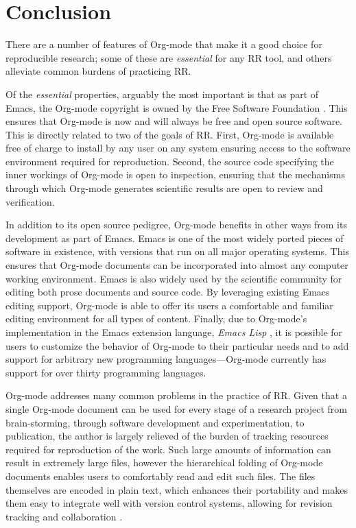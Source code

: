 \documentclass[11pt]{article}
\begin{document}
\section{Conclusion}
\label{sec-5}

There are a number of features of Org-mode that make it a good choice
for reproducible research; some of these are \emph{essential} for any RR
tool, and others alleviate common burdens of practicing RR.

Of the \emph{essential} properties, arguably the most important is that
as part of Emacs, the Org-mode copyright is owned by the Free Software
Foundation \cite{fsf}.  This ensures that Org-mode is now and will
always be free and open source software.  This is directly related to
two of the goals of RR.  First, Org-mode is available free of charge
to install by any user on any system ensuring access to the software
environment required for reproduction.  Second, the source code
specifying the inner workings of Org-mode is open to inspection,
ensuring that the mechanisms through which Org-mode generates
scientific results are open to review and verification.

In addition to its open source pedigree, Org-mode benefits in other
ways from its development as part of Emacs.  Emacs is one of the most
widely ported pieces of software in existence, with versions that run
on all major operating systems.  This ensures that Org-mode documents
can be incorporated into almost any computer working environment.
Emacs is also widely used by the scientific community for editing both
prose documents and source code.  By leveraging existing Emacs
editing support, Org-mode is able to offer its users a comfortable and
familiar editing environment for all types of content.  Finally, due
to Org-mode's implementation in the Emacs extension language, \emph{Emacs Lisp} \cite{elisp}, it is possible for users to customize the behavior
of Org-mode to their particular needs and to add support for arbitrary
new programming languages---Org-mode currently has support for over
thirty programming languages.

Org-mode addresses many common problems in the practice of RR.  Given
that a single Org-mode document can be used for every stage of a
research project from brain-storming, through software development and
experimentation, to publication, the author is largely relieved of the
burden of tracking resources required for reproduction of the work.
Such large amounts of information can result in extremely large
files, however the hierarchical folding of Org-mode documents enables
users to comfortably read and edit such files.  The files themselves are encoded in plain
text, which enhances their portability and makes them easy to integrate
well with version control systems, allowing for revision tracking and
collaboration \cite{cise-vc}.
\end{document}
